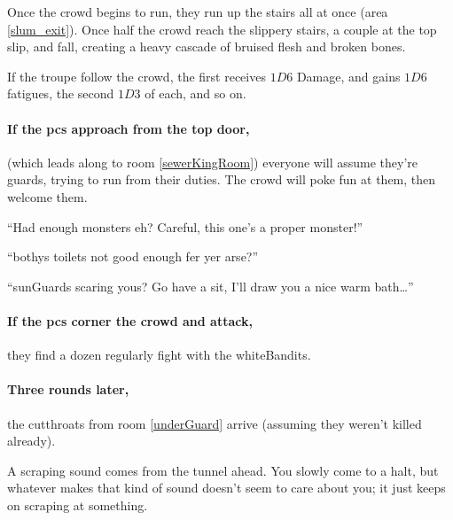 Once the crowd begins to run, they run up the stairs all at once (area \vref{slum_exit}).
Once half the crowd reach the slippery stairs, a couple at the top slip, and fall, creating a heavy cascade of bruised flesh and broken bones.

If the troupe follow the crowd, the first receives $1D6$ Damage, and gains $1D6$ \glspl{fatigue}, the second $1D3$ of each, and so on.

\paragraph{If the \glspl{pc} approach from the top door,}
(which leads along to room \ref{sewerKingRoom}) everyone will assume they're \glspl{guard}, trying to run from their duties.
The crowd will poke fun at them, then welcome them.

\begin{speechtext}

  ``Had enough monsters eh?
  Careful, this one's a proper monster!''

  ``\Glspl{bothy} toilets not good enough fer yer arse?''

  ``\Glspl{sunGuard} scaring yous?
  Go have a sit, I'll draw you a nice warm bath\ldots''
\end{speechtext}

\paragraph{If the \glspl{pc} corner the crowd and attack,}
they find a dozen regularly fight with the \gls{whiteBandits}.

\sewerking



\paragraph{Three rounds later,}
the cutthroats from room \ref{underGuard} arrive (assuming they weren't killed already).

\begin{boxtext}
  A scraping sound comes from the tunnel ahead.
  You slowly come to a halt, but whatever makes that kind of sound doesn't seem to care about you; it just keeps on scraping at something.
\end{boxtext}
 

